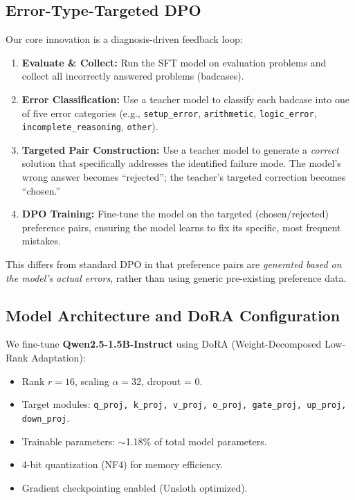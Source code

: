 \documentclass{article}
\begin{document}
\subsection{Error-Type-Targeted DPO}

Our core innovation is a diagnosis-driven feedback loop:

\begin{enumerate}[noitemsep]
    \item \textbf{Evaluate \& Collect:} Run the SFT model on evaluation problems and collect all incorrectly answered problems (badcases).
    \item \textbf{Error Classification:} Use a teacher model to classify each badcase into one of five error categories (e.g., \texttt{setup\_error}, \texttt{arithmetic}, \texttt{logic\_error}, \texttt{incomplete\_reasoning}, \texttt{other}).
    \item \textbf{Targeted Pair Construction:} Use a teacher model to generate a \textit{correct} solution that specifically addresses the identified failure mode. The model's wrong answer becomes ``rejected''; the teacher's targeted correction becomes ``chosen.''
    \item \textbf{DPO Training:} Fine-tune the model on the targeted (chosen/rejected) preference pairs, ensuring the model learns to fix its specific, most frequent mistakes.
\end{enumerate}

This differs from standard DPO in that preference pairs are \textit{generated based on the model's actual errors}, rather than using generic pre-existing preference data.

\subsection{Model Architecture and DoRA Configuration}
We fine-tune \textbf{Qwen2.5-1.5B-Instruct} using DoRA (Weight-Decomposed Low-Rank Adaptation):
\begin{itemize}[noitemsep]
    \item Rank $r = 16$, scaling $\alpha = 32$, dropout = 0.
    \item Target modules: \texttt{q\_proj, k\_proj, v\_proj, o\_proj, gate\_proj, up\_proj, down\_proj}.
    \item Trainable parameters: $\sim$1.18\% of total model parameters.
    \item 4-bit quantization (NF4) for memory efficiency.
    \item Gradient checkpointing enabled (Unsloth optimized).
\end{itemize}
\end{document}

